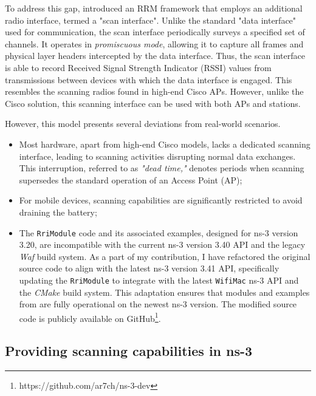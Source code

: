 To address this gap, \cite{bharadwajSimulationFrameworkRadio2017} introduced an RRM framework that employs an additional radio interface, termed a "scan interface". Unlike the standard "data interface" used for communication, the scan interface periodically surveys a specified set of channels. It operates in \textit{promiscuous mode}, allowing it to capture all frames and physical layer headers intercepted by the data interface. Thus, the scan interface is able to record Received Signal Strength Indicator (RSSI) values from transmissions between devices with which the data interface is engaged. This resembles the scanning radios found in high-end Cisco APs. However, unlike the Cisco solution, this scanning interface can be used with both APs and stations.

However, this model presents several deviations from real-world scenarios.
\begin{itemize}
    \item Most hardware, apart from high-end Cisco models, lacks a dedicated scanning interface, leading to scanning activities disrupting normal data exchanges. This interruption, referred to as \textit{"dead time,"} denotes periods when scanning supersedes the standard operation of an Access Point (AP);
    \item For mobile devices, scanning capabilities are significantly restricted to avoid draining the battery;
    \item The \texttt{RriModule} code and its associated examples, designed for ns-3 version 3.20, are incompatible with the current ns-3 version 3.40 API and the legacy \textit{Waf} build system. As a part of my contribution, I have refactored the original source code to align with the latest ns-3 version 3.41 API, specifically updating the \texttt{RriModule} to integrate with the latest \texttt{WifiMac} ns-3 API and the \textit{CMake} build system. This adaptation ensures that modules and examples from \cite{bharadwajSimulationFrameworkRadio2017} are fully operational on the newest ns-3 version. The modified source code is publicly available on GitHub\footnote{https://github.com/ar7ch/ns-3-dev}.
\end{itemize}

\subsection{Providing scanning capabilities in ns-3}
\label{chap:impl:sec:simulation_method:subsec:scanning}

